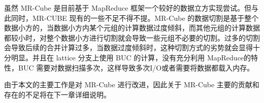 虽然 MR-Cube 是目前基于 MapReduce 框架一个较好的数据立方实现尝试。但与此同时，MR-CUBE 现有的一些不足不得不提。MR-Cube 的数据切割是基于整个数据小方的，当数据小方内某个元组的计算数据过度倾斜，而其他元组的计算数据都较小时，对整个数据小方进行切割就会导致一些元组不必要的切割。过多的切割会导致后续的合并计算过多，当数据过度倾斜时，这种切割方式的劣势就会显得十分明显。并且在 lattice 分支上使用 BUC 的计算，没有充分利用 MapReduce的特性，BUC 需要对数据扫描多次，这样导致多次I/O或者需要将数据都载入内存。

由于本文的主要工作是对 MR-Cube 进行改进，因此关于 MR-Cube 主要的贡献和存在的不足将在下一章详细说明。



